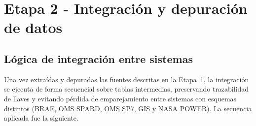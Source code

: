 \section{Etapa 2 - Integración y depuración de datos}

\subsection{Lógica de integración entre sistemas}

Una vez extraídas y depuradas las fuentes descritas en la Etapa~1, la integración se ejecuta de forma secuencial sobre tablas intermedias, preservando trazabilidad de llaves y evitando pérdida de emparejamiento entre sistemas con esquemas distintos (BRAE, OMS SPARD, OMS SP7, GIS y NASA POWER). La secuencia aplicada fue la siguiente.

